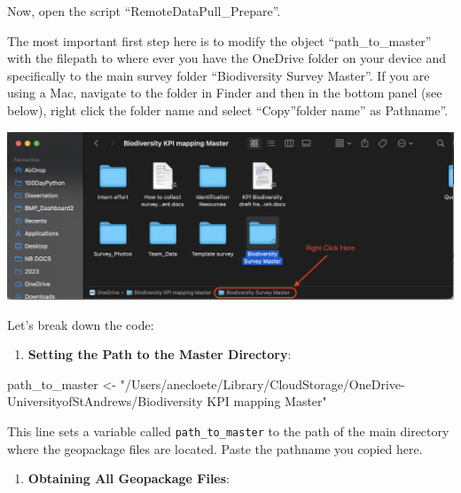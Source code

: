 \documentclass[
]{book}
\newenvironment{Shaded}{\begin{snugshade}}{\end{snugshade}}
\newcommand{\AttributeTok}[1]{\textcolor[rgb]{0.13,0.29,0.53}{#1}}
\newcommand{\ConstantTok}[1]{\textcolor[rgb]{0.56,0.35,0.01}{#1}}
\newcommand{\FunctionTok}[1]{\textcolor[rgb]{0.13,0.29,0.53}{\textbf{#1}}}
\newcommand{\NormalTok}[1]{#1}
\newcommand{\OtherTok}[1]{\textcolor[rgb]{0.56,0.35,0.01}{#1}}
\newcommand{\SpecialCharTok}[1]{\textcolor[rgb]{0.81,0.36,0.00}{\textbf{#1}}}
\newcommand{\StringTok}[1]{\textcolor[rgb]{0.31,0.60,0.02}{#1}}
\providecommand{\tightlist}{%
  \setlength{\itemsep}{0pt}\setlength{\parskip}{0pt}}
\begin{document}
Now, open the script ``RemoteDataPull\_Prepare''.

The most important first step here is to modify the object ``path\_to\_master'' with the filepath to where ever you have the OneDrive folder on your device and specifically to the main survey folder ``Biodiversity Survey Master''. If you are using a Mac, navigate to the folder in Finder and then in the bottom panel (see below), right click the folder name and select ``Copy''folder name'' as Pathname''.

\includegraphics{images/pathname_copy.png}

Let's break down the code:

\begin{enumerate}
\def\labelenumi{\arabic{enumi}.}
\tightlist
\item
  \textbf{Setting the Path to the Master Directory}:
\end{enumerate}

\begin{Shaded}
\begin{Highlighting}[]
\NormalTok{   path\_to\_master }\OtherTok{\textless{}{-}} \StringTok{"/Users/anecloete/Library/CloudStorage/OneDrive{-}UniversityofStAndrews/Biodiversity KPI mapping Master"}
\end{Highlighting}
\end{Shaded}

This line sets a variable called \texttt{path\_to\_master} to the path of the main directory where the geopackage files are located. Paste the pathname you copied here.

\begin{enumerate}
\def\labelenumi{\arabic{enumi}.}
\setcounter{enumi}{1}
\tightlist
\item
  \textbf{Obtaining All Geopackage Files}:
\end{enumerate}

\begin{Shaded}
\end{Shaded}
\end{document}
